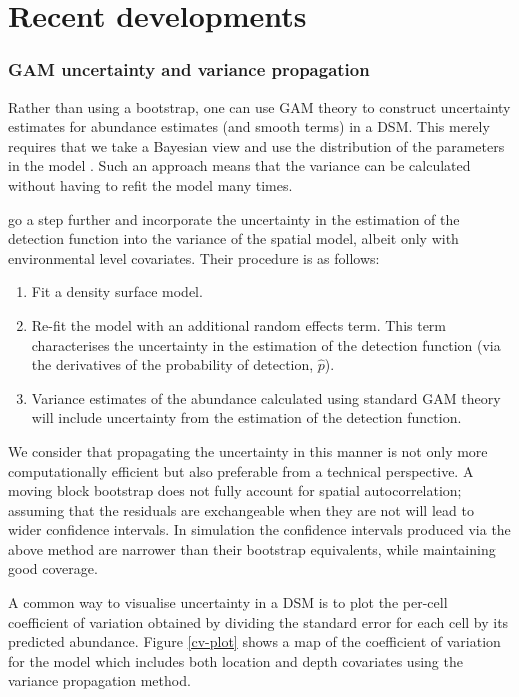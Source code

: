 \documentclass[a4paper,12pt]{article}
\begin{document}
\section*{Recent developments}
\label{s:recentadvances}

\subsubsection*{GAM uncertainty and variance propagation}

Rather than using a bootstrap, one can use GAM theory to construct uncertainty estimates for abundance estimates (and smooth terms) in a DSM. This merely requires that we take a Bayesian view and use the distribution of the parameters in the model \citep[further information can found in][page 245]{Wood:2006wz}. Such an approach means that the variance can be calculated without having to refit the model many times.
 
\cite{WILLIAMS:2011in} go a step further and incorporate the uncertainty in the estimation of the detection function into the variance of the spatial model, albeit only with environmental level covariates. Their procedure is as follows:
\begin{enumerate}
\item Fit a density surface model.
\item Re-fit the model with an additional random effects term. This term characterises the uncertainty in the estimation of the detection function (via the derivatives of the probability of detection, $\hat{p}$).
\item Variance estimates of the abundance calculated using standard GAM theory will include uncertainty from the estimation of the detection function.
\end{enumerate}
We consider that propagating the uncertainty in this manner is not only more computationally efficient but also preferable from a technical perspective. A moving block bootstrap does not fully account for spatial autocorrelation; assuming that the residuals are exchangeable when they are not will lead to wider confidence intervals. In simulation the confidence intervals produced via the above method are narrower than their bootstrap equivalents, while maintaining good coverage.

A common way to visualise uncertainty in a DSM is to plot the per-cell coefficient of variation obtained by dividing the standard error for each cell by its predicted abundance. Figure \ref{cv-plot} shows a map of the coefficient of variation for the model which includes both location and depth covariates using the variance propagation method. 
\end{document}
